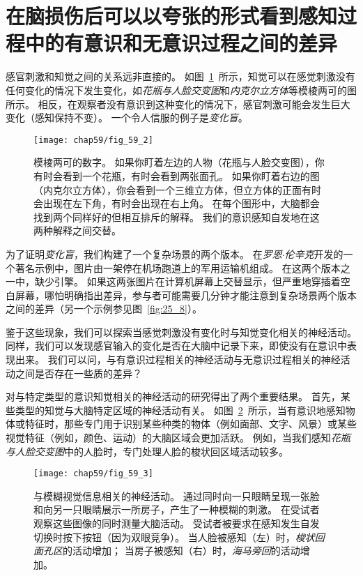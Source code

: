 \section{在脑损伤后可以以夸张的形式看到感知过程中的有意识和无意识过程之间的差异}

感官刺激和知觉之间的关系远非直接的。
如图~\ref{fig:59_2}~所示，知觉可以在感觉刺激没有任何变化的情况下发生变化，如\textit{花瓶与人脸交变图}和\textit{内克尔立方体}等模棱两可的图所示。
相反，在观察者没有意识到这种变化的情况下，感官刺激可能会发生巨大变化（感知保持不变）。
一个令人信服的例子是\textit{变化盲}。


\begin{figure}[htbp]
	\centering
	\texttt{[image: chap59/fig\_59\_2]}
	\caption{模棱两可的数字。
		如果你盯着左边的人物（花瓶与人脸交变图），你有时会看到一个花瓶，有时会看到两张面孔。
		如果你盯着右边的图（内克尔立方体），你会看到一个三维立方体，但立方体的正面有时会出现在左下角，有时会出现在右上角。
		在每个图形中，大脑都会找到两个同样好的但相互排斥的解释。
		我们的意识感知自发地在这两种解释之间交替。}
	\label{fig:59_2}
\end{figure}


为了证明\textit{变化盲}，我们构建了一个复杂场景的两个版本。
在\textit{罗恩$\cdot$伦辛克}开发的一个著名示例中，图片由一架停在机场跑道上的军用运输机组成。
在这两个版本之一中，缺少引擎。
如果这两张图片在计算机屏幕上交替显示，但严重地穿插着空白屏幕，哪怕明确指出差异，参与者可能需要几分钟才能注意到复杂场景两个版本之间的差异（另一个示例参见图~\ref{fig:25_8}）。


鉴于这些现象，我们可以探索当感觉刺激没有变化时与知觉变化相关的神经活动。
同样，我们可以发现感官输入的变化是否在大脑中记录下来，即使没有在意识中表现出来。
我们可以问，与有意识过程相关的神经活动与无意识过程相关的神经活动之间是否存在一些质的差异？


对与特定类型的意识知觉相关的神经活动的研究得出了两个重要结果。
首先，某些类型的知觉与大脑特定区域的神经活动有关。
如图~\ref{fig:59_3}~所示，当有意识地感知物体或特征时，那些专门用于识别某些种类的物体（例如面部、文字、风景）或某些视觉特征（例如，颜色、运动）的大脑区域会更加活跃。
例如，当我们感知\textit{花瓶与人脸交变图}中的人脸时，专门处理人脸的梭状回区域活动较多。


\begin{figure}[htbp]
	\centering
	\texttt{[image: chap59/fig\_59\_3]}
	\caption{与模糊视觉信息相关的神经活动。
		通过同时向一只眼睛呈现一张脸和向另一只眼睛展示一所房子，产生了一种模糊的刺激。
		在受试者观察这些图像的同时测量大脑活动。
		受试者被要求在感知发生自发切换时按下按钮（因为双眼竞争）。
		当人脸被感知（左）时，\textit{梭状回面孔区}的活动增加；
		当房子被感知（右）时，\textit{海马旁回}的活动增加\cite{tong1998binocular}。}
	\label{fig:59_3}
\end{figure}



